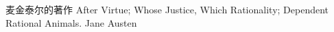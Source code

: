 

麦金泰尔的著作
    After Virtue; 
    Whose Justice, Which Rationality; 
    Dependent Rational Animals.
Jane Austen



